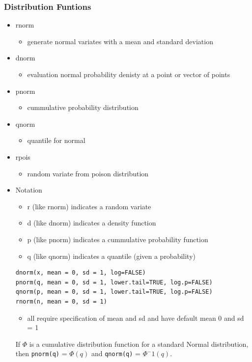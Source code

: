 \documentclass[11pt]{article}
\begin{document}
\subsubsection{Distribution Funtions}
\label{sec-3-1-1}
\begin{itemize}

\item rnorm
\label{sec-3-1-1-1}%
\begin{itemize}
\item generate normal variates with a mean and standard deviation
\end{itemize}


\item dnorm
\label{sec-3-1-1-2}%
\begin{itemize}
\item evaluation normal probability denisty at a point or vector of points
\end{itemize}


\item pnorm
\label{sec-3-1-1-3}%
\begin{itemize}
\item cummulative probability distribution
\end{itemize}


\item qnorm
\label{sec-3-1-1-4}%
\begin{itemize}
\item quantile for normal
\end{itemize}


\item rpois
\label{sec-3-1-1-5}%
\begin{itemize}
\item random variate from poison distribution
\end{itemize}


\item Notation
\label{sec-3-1-1-6}%
\begin{itemize}
\item r (like rnorm) indicates a random variate
\item d (like dnorm) indicates a density function
\item p (like pnorm) indicates a cummulative probability function
\item q (like qnorm) indicates a quantile (given a probability)
\end{itemize}



\begin{verbatim}
dnorm(x, mean = 0, sd = 1, log=FALSE)
pnorm(q, mean = 0, sd = 1, lower.tail=TRUE, log.p=FALSE)
qnorm(p, mean = 0, sd = 1, lower.tail=TRUE, log.p=FALSE)
rnorm(n, mean = 0, sd = 1)
\end{verbatim}
\begin{itemize}
\item all require specification of mean and sd and have default mean 0
  and sd = 1
\end{itemize}
If $\Phi$ is a cumulative distribution function for a standard Normal
distribution, then \texttt{pnorm(q)} = $\Phi(q)$ and \texttt{qnorm(q)} =
$\Phi^-1(q)$.



\end{itemize}
\end{document}

